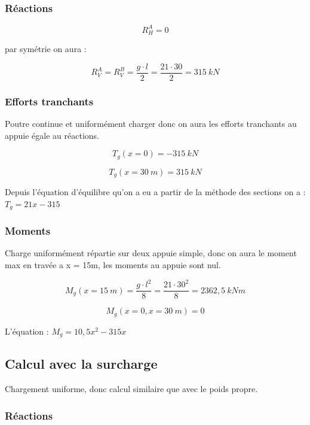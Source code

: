 \documentclass[12pt,a4paper]{article}
\begin{document}
	\subsubsection{Réactions}
	
	\[ R_{H}^{A} = 0 \]
	
	{\centering par symétrie on aura : \par }
	
	\[ R_{V}^{A} = R_{V}^{B} = \dfrac{g \cdot l}{2} = \dfrac{21 \cdot 30}{2} = 315 ~\unit{kN} \]
	
	
	\subsubsection{Efforts tranchants}
	
	Poutre continue et uniformément charger donc on aura les efforts tranchants au appuie égale au réactions.
	
	\[ T_{g}(x = 0) =  - 315 ~\unit{kN} \]
	
	\[ T_{g}(x = 30 ~\unit{m}) = 315 ~\unit{kN} \]
	

	\vspace{\baselineskip}
	
	Depuis l'équation d'équilibre qu'on a eu a partir de la méthode des sections on a : $T_{g} = 21x - 315$
	
	
	\subsubsection{Moments}
	
	Charge uniformément répartie sur deux appuie simple, donc on aura le moment max en travée a x = 15m, les moments au appuie sont nul.
	
	\[ M_{g}(x = 15 ~\unit{m}) = \dfrac{g \cdot l^{2}}{8} = \dfrac{21 \cdot 30^{2}}{8} = 2362,5 ~\unit{kNm} \]
	
	\[ M_{g}(x = 0,x = 30 ~\unit{m}) = 0 \]
	
	\vspace{\baselineskip}
	
	L'équation : $M_{g} = 10,5x^{2} - 315x$
	
	\subsection{Calcul avec la surcharge}
	
	Chargement uniforme, donc calcul similaire que avec le poids propre.
	
	\subsubsection{Réactions}
	
\end{document}
